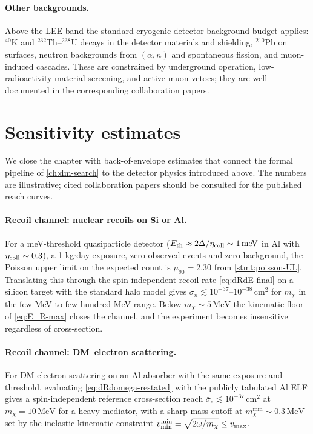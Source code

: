 \paragraph{Other backgrounds.}
Above the LEE band the standard cryogenic-detector background
budget applies: $^{40}$K and $^{232}$Th--$^{238}$U decays in the
detector materials and shielding, $^{210}$Pb on surfaces, neutron
backgrounds from $(\alpha,n)$ and spontaneous fission, and
muon-induced cascades. These are constrained by underground
operation, low-radioactivity material screening, and active
muon vetoes; they are well documented in the corresponding
collaboration papers.

\section{Sensitivity estimates}
\label{sec:qp-sensitivity}

We close the chapter with back-of-envelope estimates that connect
the formal pipeline of \cref{ch:dm-search} to the detector physics
introduced above. The numbers are illustrative; cited collaboration
papers should be consulted for the published reach curves.

\paragraph{Recoil channel: nuclear recoils on Si or Al.}
For a meV-threshold quasiparticle detector
($E_\text{th}\approx 2\Delta/\eta_{\rm coll}\sim 1\,\text{meV}$
in Al with $\eta_{\rm coll}\sim 0.3$), a 1-kg$\cdot$day exposure,
zero observed events and zero background, the Poisson upper
limit on the expected count is $\mu_{90}=2.30$ from
\cref{stmt:poisson-UL}.  Translating this through the
spin-independent recoil rate \cref{eq:dRdE-final} on a silicon
target with the standard halo model gives
$\sigma_n\lesssim 10^{-37}$--$10^{-38}\,\text{cm}^2$ for $m_\chi$
in the few-MeV to few-hundred-MeV range. Below
$m_\chi\sim 5\,\text{MeV}$ the kinematic floor of
\cref{eq:E_R-max} closes the channel, and the experiment becomes
insensitive regardless of cross-section.

\paragraph{Recoil channel: DM--electron scattering.}
For DM-electron scattering on an Al absorber with the same
exposure and threshold, evaluating \cref{eq:dRdomega-restated}
with the publicly tabulated Al ELF gives a spin-independent
reference cross-section reach
$\bar\sigma_e\lesssim 10^{-37}\,\text{cm}^2$ at
$m_\chi=10\,\text{MeV}$ for a heavy mediator, with a sharp
mass cutoff at $m_\chi^{\min}\sim 0.3\,\text{MeV}$ set by the
inelastic kinematic constraint
$v_{\rm min}^{\min}=\sqrt{2\omega/m_\chi}\leq v_{\rm max}$.

